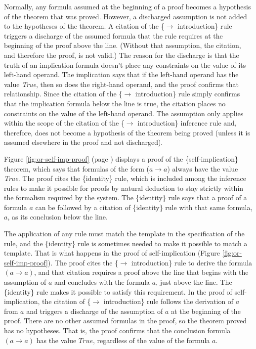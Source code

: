 {Normally, any formula assumed at the beginning of a proof
becomes a hypothesis of the theorem that was proved.
However, a discharged assumption
is not added to the hypotheses of the theorem.
A citation of the \{$\rightarrow$ introduction\} rule
triggers a discharge of the assumed formula that the
rule requires at the beginning of the proof above the line.
(Without that assumption, the citation,
and therefore the proof, is not valid.)
The reason for the discharge is that the truth of an implication
formula doesn't place any constraints on the value of its
left-hand operand.
The implication says that if the left-hand operand
has the value \emph{True}, then so does the right-hand operand,
and the proof confirms that relationship.
Since the citation of the
\{$\rightarrow$ introduction\} rule
simply confirms that the implication formula below the line
is true, the citation places no constraints on the value
of the left-hand operand.
The assumption only applies within the scope
of the citation of the \{$\rightarrow$ introduction\} inference rule
and, therefore, does not become a hypothesis of the theorem being proved
(unless it is assumed elsewhere in the proof and not discharged).

Figure \ref{fig:or-self-imp-proof} (page \pageref{fig:or-self-imp-proof})
displays a proof of the \{self-implication\} theorem,
which says that formulas of the form ($a \rightarrow a$) always have the value \emph{True}.
The proof cites the \{identity\} rule,
which is included among the inference rules to make it
possible for proofs by natural deduction to stay strictly
within the formalism required by the system.
The \{identity\} rule says that a proof of a formula $a$
can be followed by a citation of \{identity\} rule
with that same formula, $a$, as its conclusion below the line.

The application of any rule must match 
the template in the specification of the rule,
and the \{identity\} rule is sometimes needed to make it possible to match a template.
That is what happens in the proof of self-implication (Figure \ref{fig:or-self-imp-proof}).
The proof cites the \{$\rightarrow$ introduction\} rule
to derive the formula $(a \rightarrow a)$,
and that citation requires
a proof above the line that begins with the assumption of $a$
and concludes with the formula $a$, just above the line.
The \{identity\} rule makes it possible to satisfy this requirement.
In the proof of self-implication,
the citation of \{$\rightarrow$ introduction\} rule follows
the derivation of $a$ from $a$ and triggers a discharge
of the assumption of $a$ at the beginning of the proof.
There are no other assumed formulas in the proof,
so the theorem proved has no hypotheses.
That is, the proof confirms that the conclusion formula
$(a \rightarrow a)$ has the value $True$, regardless of
the value of the formula $a$.

}
